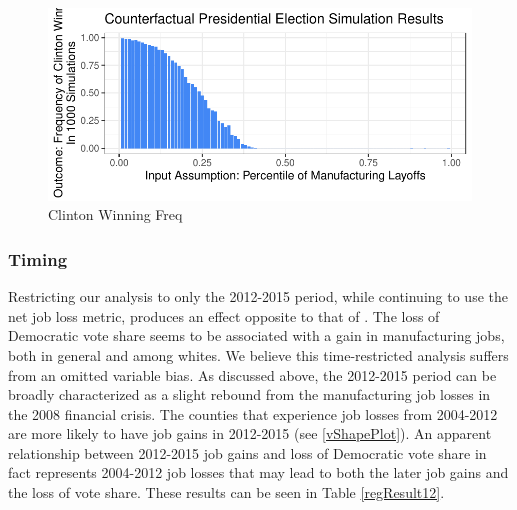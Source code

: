 \documentclass[]{AEA}
\begin{document}
\begin{figure} \label{counterfactual3}
\caption{Clinton Winning Freq}

\begin{center}\includegraphics{Final-Draft_files/figure-latex/unnamed-chunk-8-1} \end{center}
\end{figure}

\subsubsection{Timing}

Restricting our analysis to only the 2012-2015 period, while continuing
to use the net job loss metric, produces an effect opposite to that of
\cite{Baccini21}. The loss of Democratic vote share seems to be
associated with a gain in manufacturing jobs, both in general and among
whites. We believe this time-restricted analysis suffers from an omitted
variable bias. As discussed above, the 2012-2015 period can be broadly
characterized as a slight rebound from the manufacturing job losses in
the 2008 financial crisis. The counties that experience job losses from
2004-2012 are more likely to have job gains in 2012-2015 (see
\ref{vShapePlot}). An apparent relationship between 2012-2015 job gains
and loss of Democratic vote share in fact represents 2004-2012 job
losses that may lead to both the later job gains and the loss of vote
share. These results can be seen in Table \ref{regResult12}.
\end{document}
